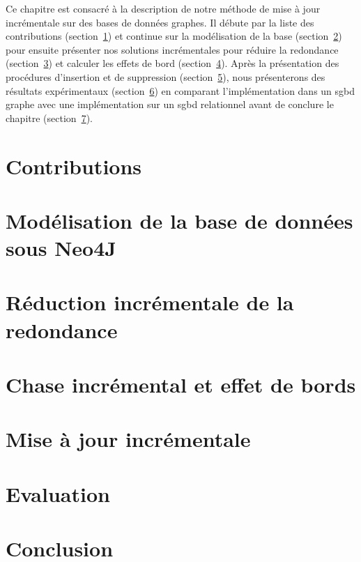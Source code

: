 Ce chapitre est consacré à la description de notre méthode de mise à jour incrémentale sur des bases de données graphes.
Il débute par la liste des contributions (section~\ref{sec:update:contrib}) et continue sur la modélisation de la base (section~\ref{sec:update:db}) pour ensuite présenter nos solutions incrémentales pour réduire la redondance (section~\ref{sec:update:simplify}) et calculer les effets de bord (section~\ref{sec:update:chase}).
Après la présentation des procédures d'insertion et de suppression (section~\ref{sec:update:update}), nous présenterons des résultats expérimentaux (section~\ref{sec:update:evaluation}) en comparant l'implémentation dans un \gls{sgbd} graphe avec une implémentation sur un \gls{sgbd} relationnel avant de conclure le chapitre (section~\ref{sec:update:conclusion}).

\section{Contributions}
\label{sec:update:contrib}


\section{Modélisation de la base de données sous Neo4J}
\label{sec:update:db}


\section{Réduction incrémentale de la redondance}
\label{sec:update:simplify}


\pagebreak
\section{Chase incrémental et effet de bords}
\label{sec:update:chase}


\section{Mise à jour incrémentale}
\label{sec:update:update}


\section{Evaluation}
\label{sec:update:evaluation}


\section{Conclusion}
\label{sec:update:conclusion}

